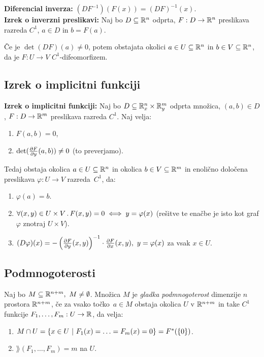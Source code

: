 \textbf{Diferencial inverza:} $(DF^{-1})(F(x)) = (DF)^{-1}(x)$. \\
\textbf{Izrek o inverzni preslikavi:} Naj bo $D \subseteq \mathbb{R}^n$ odprta, $F: D \to \mathbb{R}^n$ preslikava razreda $C^1$,  $a \in D$ in $b = F(a)$.


Če je $\det(DF)(a) \neq 0$, potem obstajata okolici $a \in U \subseteq \mathbb{R}^n$ in $b \in V \subseteq \mathbb{R}^n$, da je $F: U \to V$ $C^1$-difeomorfizem.

\subsection*{Izrek o implicitni funkciji}
\textbf{Izrek o implicitni funkciji:} Naj bo $D\subseteq \mathbb{R}_x^n \times \mathbb{R}_y^m$ odprta množica, $(a, b) \in D$, $F: D \to \mathbb{R}^m$ preslikava razreda $C^1$. Naj velja:
\begin{enumerate}
    \item $F(a, b) = 0$,
    \item $\det(\frac{\partial F}{\partial y}(a,b)) \neq 0$ (to preverjamo).
\end{enumerate}
Tedaj obstaja okolica $a \in U \subseteq \mathbb{R}^n$ in okolica $b \in V \subseteq \mathbb{R}^m$ in enolično določena preslikava $\varphi: U \to V$ razreda~$C^1$, da:
\begin{enumerate}
    \item $\varphi(a) = b$.
    \item $\forall (x,y) \in U \times V \,.\, F(x,y) = 0 \iff y = \varphi(x)$ (rešitve te enačbe je isto kot graf $\varphi$ znotraj $U \times V$).
    \item $(D \varphi)(x) = - \left(\frac{\partial F}{\partial y}(x,y)\right)^{-1} \cdot \frac{\partial F}{\partial x}(x,y), \ y = \varphi(x)$ za vsak $x \in U$.
\end{enumerate}

\subsection*{Podmnogoterosti}
Naj bo $M \subseteq \mathbb{R}^{n+m}, \ M \neq \emptyset$. Množica $M$ je \emph{gladka podmnogoterost} dimenzije $n$ prostora $\mathbb{R}^{n+m}$, če za vsako točko~$a \in M$ obstaja okolica $U$ v $\mathbb{R}^{n+m}$ in take $C^1$ funkcije $F_1, \ldots, F_m: U \to \mathbb{R}$, da velja:
\begin{enumerate}
    \item $M \cap U = \left\{x \in U \ | \ F_1(x) = \ldots = F_m(x) = 0\right\} = F^*(\left\{0\right\})$.
    \item $\rang(F_1, \ldots, F_m) = m$ na $U$.
\end{enumerate}

